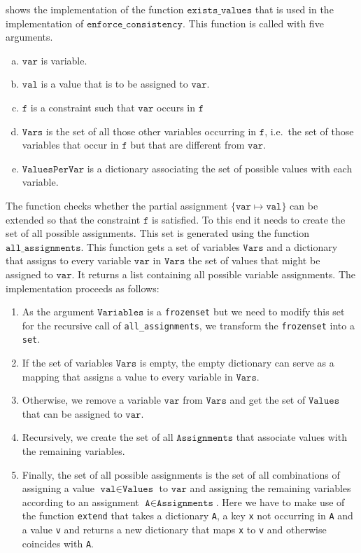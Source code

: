 \noindent
{} shows the implementation of the function $\texttt{exists\_values}$ that
is used in the implementation of $\texttt{enforce\_consistency}$.  This function is called with five arguments.
\begin{enumerate}[(a)]
\item $\texttt{var}$ is variable.
\item $\texttt{val}$ is a value that is to be assigned to $\texttt{var}$.
\item $\texttt{f}$ is a constraint such that $\texttt{var}$ occurs in $\texttt{f}$
\item $\texttt{Vars}$ is the set of all those other variables occurring in $\texttt{f}$, i.e.~the set of those
      variables that occur in $\texttt{f}$ but that are different from $\texttt{var}$. 
\item $\texttt{ValuesPerVar}$  is a dictionary associating the set of possible values with each variable.
\end{enumerate}
The function checks whether the partial assignment $\{ \texttt{var} \mapsto \texttt{val} \}$ can be
extended so that the constraint $\texttt{f}$ is satisfied.  To this end it needs to create the set of all
possible assignments.  This set is generated using the function $\texttt{all\_assignments}$.  This function
gets a set of variables $\texttt{Vars}$ and a dictionary that assigns to every variable $\texttt{var}$ in
$\texttt{Vars}$ the set of values that might be assigned to $\texttt{var}$.  It returns a list containing all
possible variable assignments.  The implementation proceeds as follows:
\begin{enumerate}
\item As the argument $\texttt{Variables}$ is a \texttt{frozenset} but we need to modify this set for the
      recursive call of \texttt{all\_assignments}, we transform the \texttt{frozenset} into a \texttt{set}.
\item If the set of variables $\texttt{Vars}$ is empty, the empty dictionary can serve as a mapping that 
      assigns a value to every variable in $\texttt{Vars}$.
\item Otherwise, we remove a variable $\texttt{var}$ from $\texttt{Vars}$ and get the set of $\texttt{Values}$
      that can be assigned to $\texttt{var}$.  
\item Recursively, we create the set of all $\texttt{Assignments}$ that associate values with the remaining 
      variables.
\item Finally, the set of all possible assignments is the set of all combinations of assigning a value 
      $\texttt{val} \in \texttt{Values}$ to $\texttt{var}$ and assigning the remaining variables according to 
      an assignment $\texttt{A} \in \texttt{Assignments}$.  Here we have to make use of the function
      \texttt{extend} that takes a dictionary \texttt{A}, a key \texttt{x} not occurring in \texttt{A} and a
      value \texttt{v} and returns a new dictionary that maps \texttt{x} to \texttt{v} and otherwise coincides
      with \texttt{A}.
\end{enumerate}
